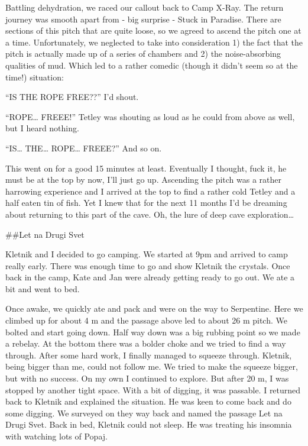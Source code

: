 Battling dehydration, we raced our callout back to Camp X-Ray. The
return journey was smooth apart from - big surprise - Stuck in Paradise.
There are sections of this pitch that are quite loose, so we agreed to
ascend the pitch one at a time. Unfortunately, we neglected to take into
consideration 1) the fact that the pitch is actually made up of a series
of chambers and 2) the noise-absorbing qualities of mud. Which led to a
rather comedic (though it didn't seem so at the time!) situation:

``IS THE ROPE FREE??'' I'd shout.

``ROPE\ldots{} FREEE!'' Tetley was shouting as loud as he could from
above as well, but I heard nothing.

``IS\ldots{} THE\ldots{} ROPE\ldots{} FREEE?'' And so on.

This went on for a good 15 minutes at least. Eventually I thought, fuck
it, he must be at the top by now, I'll just go up. Ascending the pitch
was a rather harrowing experience and I arrived at the top to find a
rather cold Tetley and a half eaten tin of fish. Yet I knew that for the
next 11 months I'd be dreaming about returning to this part of the cave.
Oh, the lure of deep cave exploration\ldots{}


\#\#Let na Drugi Svet

Kletnik and I decided to go camping. We started at 9pm and arrived to
camp really early. There was enough time to go and show Kletnik the
crystals. Once back in the camp, Kate and Jan were already getting ready
to go out. We ate a bit and went to bed.

Once awake, we quickly ate and pack and were on the way to Serpentine.
Here we climbed up for about 4 m and the passage above led to about 26 m
pitch. We bolted and start going down. Half way down was a big rubbing
point so we made a rebelay. At the bottom there was a bolder choke and
we tried to find a way through. After some hard work, I finally managed
to squeeze through. Kletnik, being bigger than me, could not follow me.
We tried to make the squeeze bigger, but with no success. On my own I
continued to explore. But after 20 m, I was stopped by another tight
space. With a bit of digging, it was passable. I returned back to
Kletnik and explained the situation. He was keen to come back and do
some digging. We surveyed on they way back and named the passage Let na
Drugi Svet. Back in bed, Kletnik could not sleep. He was treating his
insomnia with watching lots of Popaj.

